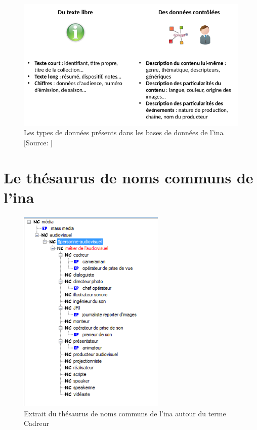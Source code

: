 \begin{figure}[!h]
	\centering
	\includegraphics[width=15cm]{images/type_donnees_axel.png}
	\medskip
	\caption[Les types de données présents dans les bases de données de l'\ac{ina}]{Les types de données présents dans les bases de données de l'\ac{ina} [Source: \cite[p.6]{roche-diore_atelier_2020}]}
\end{figure}

\chapter{\label{annexe_thesaurus}Le thésaurus de noms communs de l'\ac{ina}}

\begin{figure}[!h]
	\centering
	\includegraphics[width=7cm]{images/cadreur_hierarchie.png}
	\medskip
	\caption[Extrait du thésaurus de noms communs de l'\ac{ina}]{Extrait du thésaurus de noms communs de l'\ac{ina} autour du terme \og Cadreur\fg{}}
\end{figure}

